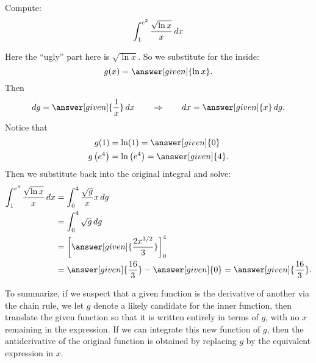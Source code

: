 \documentclass{ximera}
\begin{document}
\begin{example}
  Compute:
  \[
  \int_{1}^{e^{2}} \frac{\sqrt{\ln x}}{x} \mathop{}\!d x
  \]
\begin{explanation}
Here the ``ugly'' part here is $\sqrt{\ln x}$.  So we substitute for
the inside:
\[
g(x)=\answer[given]{\ln x}.
\]
Then
\[
\d g =  \answer[given]{\frac{1}{x}} \d x 	\qquad	\Rightarrow	\qquad	\d x = \answer[given]{x} \d g.
\]
Notice that
\begin{align*}
g(1) &= \ln (1) = \answer[given]{0} \\
g \left( e^{4} \right) &= \ln \left( e^{4} \right) = \answer[given]{4}.
\end{align*}
Then we substitute back into the original integral and solve:
\begin{align*}
\int_{1}^{e^{4}} \frac{\sqrt{\ln x}}{x} \d x &= \int_0^{4} \frac{\sqrt{g}}{x} x \d g  \\
&= \int_0^{4} \sqrt{g} \d g  \\
&= \eval{\answer[given]{\frac{2x^{3/2}}{3}}}_{0}^{4}  \\
&= \answer[given]{\frac{16}{3}} - \answer[given]{0} = \answer[given]{\frac{16}{3}}.
\end{align*}
\end{explanation}
\end{example}

To summarize, if we suspect that a given function is the derivative of
another via the chain rule, we let $g$ denote a likely candidate for
the inner function, then translate the given function so that it is
written entirely in terms of $g$, with no $x$ remaining in the
expression. If we can integrate this new function of $g$, then the
antiderivative of the original function is obtained by replacing $g$
by the equivalent expression in $x$.
\end{document}

